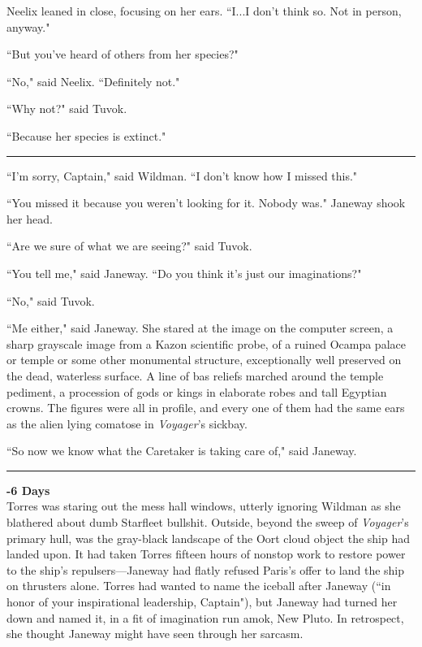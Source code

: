 \documentclass[twoside,letterpaper,12pt]{memoir}
\begin{document}
Neelix leaned in close, focusing on her ears. ``I...I don't think so. Not in person, anyway." 

``But you've heard of others from her species?" 

``No," said Neelix. ``Definitely not." 

``Why not?" said Tuvok. 

``Because her species is extinct." 

\begin{center}\rule{3cm}{0.4 pt}\end{center} 

``I'm sorry, Captain," said Wildman. ``I don't know how I missed this." 

``You missed it because you weren't looking for it. Nobody was." Janeway shook her head. 

``Are we sure of what we are seeing?" said Tuvok. 

``You tell me," said Janeway. ``Do you think it's just our imaginations?" 

``No," said Tuvok. 

``Me either," said Janeway. She stared at the image on the computer screen, a sharp grayscale image from a Kazon scientific probe, of a ruined Ocampa palace or temple or some other monumental structure, exceptionally well preserved on the dead, waterless surface. A line of bas reliefs marched around the temple pediment, a procession of gods or kings in elaborate robes and tall Egyptian crowns. The figures were all in profile, and every one of them had the same ears as the alien lying comatose in \textit{Voyager}'s sickbay. 

``So now we know what the Caretaker is taking care of," said Janeway. 

\begin{center}\rule{3cm}{0.4 pt}\end{center} 

\noindent\textbf{-6 Days}\\

Torres was staring out the mess hall windows, utterly ignoring Wildman as she blathered about dumb Starfleet bullshit. Outside, beyond the sweep of \textit{Voyager}'s primary hull, was the gray-black landscape of the Oort cloud object the ship had landed upon. It had taken Torres fifteen hours of nonstop work to restore power to the ship's repulsers---Janeway had flatly refused Paris's offer to land the ship on thrusters alone. Torres had wanted to name the iceball after Janeway (``in honor of your inspirational leadership, Captain"), but Janeway had turned her down and named it, in a fit of imagination run amok, New Pluto. In retrospect, she thought Janeway might have seen through her sarcasm. 
\end{document}
